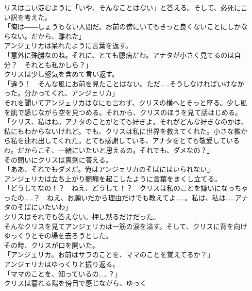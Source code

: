 \documentclass[b5j,10pt,openany]{jsbook}
\begin{document}
リスは言い淀むように「いや、そんなことはない」と答える。そして、必死に言い訳を考えた。\\「俺は――しょうもない人間だ。お前の傍にいてもきっと良くないことにしかならない。だから、離れた」\\アンジェリカは呆れたように言葉を返す。\\「意外に殊勝なのね。それに、とても臆病だわ。アナタが小さく見てるのは自分？　それとも私かしら？」\\クリスは少し怒気を含めて言い返す。\\「違う！　そんな風にお前を見たことはない。ただ\ldots{}\ldots{}そうしなければいけなかった。分かってくれ、アンジェリカ」\\それを聞いてアンジェリカはなにも言わず、クリスの横へとそっと座る。少し風を肌で感じながら空を見つめる。それから、クリスのほうを見て話はじめる。\\「クリス、私はね。アナタのことがとても好きよ。それがどんな好きなのかは、私にもわからないけれど。でも、クリスは私に世界を教えてくれた。小さな檻から私を連れ出してくれた。とても感謝している、アナタをとても敬愛しているわ。だからこそ、一緒にいたいと思えるの。それでも、ダメなの？」\\その問いにクリスは真剣に答える。\\「ああ、それでもダメだ。俺はアンジェリカのそばにはいられない」\\アンジェリカは立ち上がり癇癪を起こしたように言葉をまくし立てる。\\「どうしてなの！？　ねえ、どうして！？　クリスは私のことを嫌いになっちゃったの\ldots{}\ldots{}？　ねえ、お願いだから理由だけでも教えてよ\ldots{}\ldots{}。私は、私は\ldots{}\ldots{}アナタのそばにいたいわ」\\クリスはそれでも答えない。押し黙るだけだった。\\そんなクリスを見てアンジェリカは一筋の涙を溢す。そして、クリスに背を向けゆっくりとその場を去ろうとした。\\その時、クリスが口を開いた。\\「アンジェリカ。お前はサラのことを、ママのことを覚えてるか？」\\アンジェリカはゆっくりと振り返る。\\「ママのことを、知っているの\ldots{}\ldots{}？」\\クリスは暮れる陽を傍目で感じながら、ゆっく
\end{document}
